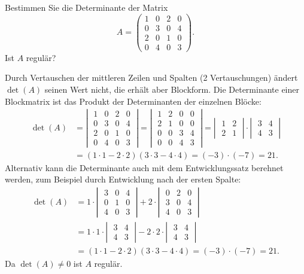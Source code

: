 Bestimmen Sie die Determinante der Matrix
\[
A=\begin{pmatrix}
1&0&2&0\\
0&3&0&4\\
2&0&1&0\\
0&4&0&3
\end{pmatrix}.
\]
Ist $A$ regulär?


\begin{loesung}
Durch Vertauschen der mittleren Zeilen und Spalten (2 Vertauschungen) ändert $\det(A)$
seinen Wert nicht, die erhält aber Blockform. Die Determinante einer Blockmatrix ist
das Produkt der Determinanten der einzelnen Blöcke:
\begin{align*}
\det(A)&=
\left|\;\begin{matrix}
1&0&2&0\\
0&3&0&4\\
2&0&1&0\\
0&4&0&3
\end{matrix}\;\right|
=
\left|\;\begin{matrix}
1&2&0&0\\
2&1&0&0\\
0&0&3&4\\
0&0&4&3
\end{matrix}\;\right|
=
\left|\;\begin{matrix}
1&2\\2&1
\end{matrix}\;\right|
\cdot
\left|\;\begin{matrix}
3&4\\4&3
\end{matrix}\;\right|
\\
&=
(1\cdot 1-2\cdot 2)(3\cdot 3-4\cdot 4)=(-3)\cdot(-7)=21.
\end{align*}
Alternativ kann die Determinante auch mit dem Entwicklungssatz
berehnet werden, zum Beispiel durch Entwicklung nach der ersten
Spalte:
\begin{align*}
\det(A)
&=
1\cdot\left|\;\begin{matrix}
3&0&4\\
0&1&0\\
4&0&3
\end{matrix}\;\right|
+
2\cdot\left|\;\begin{matrix}
0&2&0\\
3&0&4\\
4&0&3
\end{matrix}\;\right|
\\
&=
1\cdot 1\cdot\left|\;\begin{matrix}3&4\\4&3\end{matrix}\;\right|
-2\cdot 2\cdot\left|\;\begin{matrix}3&4\\4&3\end{matrix}\;\right|
\\
&=
(1\cdot 1-2\cdot 2)(3\cdot 3-4\cdot 4)=(-3)\cdot(-7)=21.
\end{align*}
Da $\det(A)\ne 0$ ist $A$ regulär.
\end{loesung}


